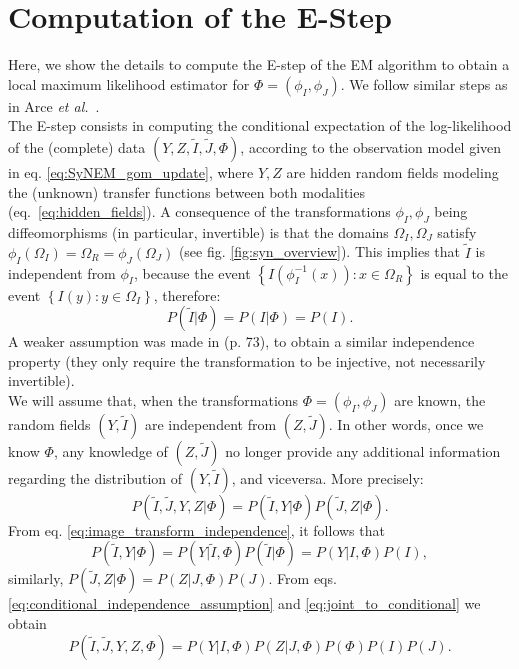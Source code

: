 \appendix
\section{Computation of the E-Step}\label{ap:E_step}
Here, we show the details to compute the E-step of the EM algorithm \cite{Dempster1977} to obtain a local maximum likelihood estimator for $\Phi = (\phi_{I}, \phi_{J})$.
We follow similar steps as in Arce {\it et al.}~\cite{Arce-santana2014}.\\

The E-step \cite{Dempster1977} consists in computing the conditional expectation of the log-likelihood of the (complete) data $(Y, Z, \tilde{I}, \tilde{J}, \Phi)$, according to the observation model given in eq. \eqref{eq:SyNEM_gom_update}, where $Y, Z$ are hidden random fields modeling the (unknown) transfer functions between both modalities \hbox{(eq. \eqref{eq:hidden_fields})}. A consequence of the transformations $\phi_{I}, \phi_{J}$ being diffeomorphisms (in particular, invertible) is that the domains $\Omega_{I}, \Omega_{J}$ satisfy \hbox{$\phi_{I}(\Omega_{I}) = \Omega_{R} = \phi_{J}(\Omega_{J})$} (see fig. \ref{fig:syn_overview}). This implies that $\tilde{I}$ is independent from $\phi_{I}$, because the event $\left\lbrace I(\phi_{I}^{-1}(x)) : x\in \Omega_{R} \right\rbrace$ is equal to the event $\left\lbrace I(y) : y\in \Omega_{I} \right\rbrace$, therefore:
\begin{equation}\label{eq:image_transform_independence}
     P(\tilde{I} | \Phi) = P(I | \Phi) = P(I).
\end{equation}
A weaker assumption was made in \cite{Roche2000} (p. 73), to obtain a similar independence property (they only require the transformation to be injective, not necessarily invertible).\\

We will assume that, when the transformations $\Phi=(\phi_{I}, \phi_{J})$ are known, the random fields $(Y, \tilde{I})$ are independent from $(Z, \tilde{J})$. In other words, once we know $\Phi$, any knowledge of $(Z, \tilde{J})$ no longer provide any additional information regarding the distribution of $(Y, \tilde{I})$, and viceversa. More precisely:
\begin{equation}\label{eq:conditional_independence_assumption}
    P(\tilde{I}, \tilde{J}, Y, Z | \Phi) = P(\tilde{I}, Y | \Phi)P(\tilde{J}, Z| \Phi).
\end{equation}
From eq. \eqref{eq:image_transform_independence}, it follows that
\begin{equation}\label{eq:joint_to_conditional}
    P(\tilde{I}, Y | \Phi) = P(Y | \tilde{I}, \Phi)P(\tilde{I} | \Phi) = P(Y | I, \Phi)P(I),
\end{equation}
similarly, $P(\tilde{J}, Z| \Phi) = P(Z| J, \Phi)P(J)$. From eqs. \eqref{eq:conditional_independence_assumption} and \eqref{eq:joint_to_conditional} we obtain
\begin{equation}\label{eq:simplified_joint_prob}
    P(\tilde{I}, \tilde{J}, Y, Z, \Phi) = P(Y | I, \Phi)P(Z| J, \Phi)P(\Phi)P(I)P(J).
\end{equation}

